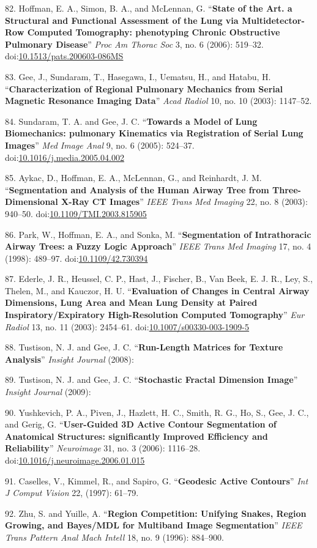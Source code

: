 \documentclass[11pt,]{article}
\begin{document}
82. Hoffman, E. A., Simon, B. A., and McLennan, G. ``\textbf{State of
the Art. a Structural and Functional Assessment of the Lung via
Multidetector-Row Computed Tomography: phenotyping Chronic Obstructive
Pulmonary Disease}'' \emph{Proc Am Thorac Soc} 3, no. 6 (2006): 519--32.
doi:\href{http://dx.doi.org/10.1513/pats.200603-086MS}{10.1513/pats.200603-086MS}

83. Gee, J., Sundaram, T., Hasegawa, I., Uematsu, H., and Hatabu, H.
``\textbf{Characterization of Regional Pulmonary Mechanics from Serial
Magnetic Resonance Imaging Data}'' \emph{Acad Radiol} 10, no. 10 (2003):
1147--52.

84. Sundaram, T. A. and Gee, J. C. ``\textbf{Towards a Model of Lung
Biomechanics: pulmonary Kinematics via Registration of Serial Lung
Images}'' \emph{Med Image Anal} 9, no. 6 (2005): 524--37.
doi:\href{http://dx.doi.org/10.1016/j.media.2005.04.002}{10.1016/j.media.2005.04.002}

85. Aykac, D., Hoffman, E. A., McLennan, G., and Reinhardt, J. M.
``\textbf{Segmentation and Analysis of the Human Airway Tree from
Three-Dimensional X-Ray CT Images}'' \emph{IEEE Trans Med Imaging} 22,
no. 8 (2003): 940--50.
doi:\href{http://dx.doi.org/10.1109/TMI.2003.815905}{10.1109/TMI.2003.815905}

86. Park, W., Hoffman, E. A., and Sonka, M. ``\textbf{Segmentation of
Intrathoracic Airway Trees: a Fuzzy Logic Approach}'' \emph{IEEE Trans
Med Imaging} 17, no. 4 (1998): 489--97.
doi:\href{http://dx.doi.org/10.1109/42.730394}{10.1109/42.730394}

87. Ederle, J. R., Heussel, C. P., Hast, J., Fischer, B., Van Beek, E.
J. R., Ley, S., Thelen, M., and Kauczor, H. U. ``\textbf{Evaluation of
Changes in Central Airway Dimensions, Lung Area and Mean Lung Density at
Paired Inspiratory/Expiratory High-Resolution Computed Tomography}''
\emph{Eur Radiol} 13, no. 11 (2003): 2454--61.
doi:\href{http://dx.doi.org/10.1007/s00330-003-1909-5}{10.1007/s00330-003-1909-5}

88. Tustison, N. J. and Gee, J. C. ``\textbf{Run-Length Matrices for
Texture Analysis}'' \emph{Insight Journal} (2008):

89. Tustison, N. J. and Gee, J. C. ``\textbf{Stochastic Fractal
Dimension Image}'' \emph{Insight Journal} (2009):

90. Yushkevich, P. A., Piven, J., Hazlett, H. C., Smith, R. G., Ho, S.,
Gee, J. C., and Gerig, G. ``\textbf{User-Guided 3D Active Contour
Segmentation of Anatomical Structures: significantly Improved Efficiency
and Reliability}'' \emph{Neuroimage} 31, no. 3 (2006): 1116--28.
doi:\href{http://dx.doi.org/10.1016/j.neuroimage.2006.01.015}{10.1016/j.neuroimage.2006.01.015}

91. Caselles, V., Kimmel, R., and Sapiro, G. ``\textbf{Geodesic Active
Contours}'' \emph{Int J Comput Vision} 22, (1997): 61--79.

92. Zhu, S. and Yuille, A. ``\textbf{Region Competition: Unifying
Snakes, Region Growing, and Bayes/MDL for Multiband Image
Segmentation}'' \emph{IEEE Trans Pattern Anal Mach Intell} 18, no. 9
(1996): 884--900.
\end{document}
